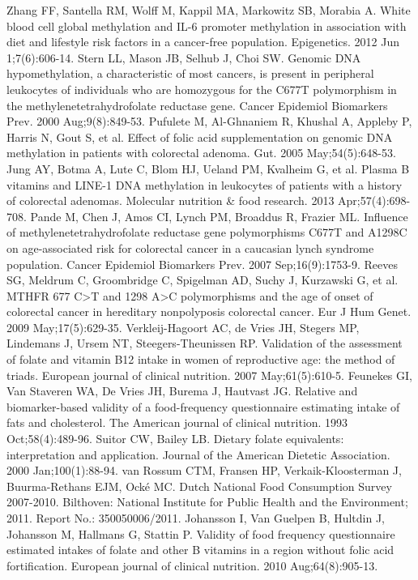 \begin{thebibliography}{12}
		Zhang FF, Santella RM, Wolff M, Kappil MA, Markowitz SB, Morabia A. White blood cell global methylation and IL-6 promoter methylation in association with diet and lifestyle risk factors in a cancer-free population. Epigenetics. 2012 Jun 1;7(6):606-14.
		Stern LL, Mason JB, Selhub J, Choi SW. Genomic DNA hypomethylation, a characteristic of most cancers, is present in peripheral leukocytes of individuals who are homozygous for the C677T polymorphism in the methylenetetrahydrofolate reductase gene. Cancer Epidemiol Biomarkers Prev. 2000 Aug;9(8):849-53.
		Pufulete M, Al-Ghnaniem R, Khushal A, Appleby P, Harris N, Gout S, et al. Effect of folic acid supplementation on genomic DNA methylation in patients with colorectal adenoma. Gut. 2005 May;54(5):648-53.
		Jung AY, Botma A, Lute C, Blom HJ, Ueland PM, Kvalheim G, et al. Plasma B vitamins and LINE-1 DNA methylation in leukocytes of patients with a history of colorectal adenomas. Molecular nutrition \& food research. 2013 Apr;57(4):698-708.
		Pande M, Chen J, Amos CI, Lynch PM, Broaddus R, Frazier ML. Influence of methylenetetrahydrofolate reductase gene polymorphisms C677T and A1298C on age-associated risk for colorectal cancer in a caucasian lynch syndrome population. Cancer Epidemiol Biomarkers Prev. 2007 Sep;16(9):1753-9.
		Reeves SG, Meldrum C, Groombridge C, Spigelman AD, Suchy J, Kurzawski G, et al. MTHFR 677 C>T and 1298 A>C polymorphisms and the age of onset of colorectal cancer in hereditary nonpolyposis colorectal cancer. Eur J Hum Genet. 2009 May;17(5):629-35.
		Verkleij-Hagoort AC, de Vries JH, Stegers MP, Lindemans J, Ursem NT, Steegers-Theunissen RP. Validation of the assessment of folate and vitamin B12 intake in women of reproductive age: the method of triads. European journal of clinical nutrition. 2007 May;61(5):610-5.
		Feunekes GI, Van Staveren WA, De Vries JH, Burema J, Hautvast JG. Relative and biomarker-based validity of a food-frequency questionnaire estimating intake of fats and cholesterol. The American journal of clinical nutrition. 1993 Oct;58(4):489-96.
		Suitor CW, Bailey LB. Dietary folate equivalents: interpretation and application. Journal of the American Dietetic Association. 2000 Jan;100(1):88-94.
		van Rossum CTM, Fransen HP, Verkaik-Kloosterman J, Buurma-Rethans EJM, Ock{\'e} MC. Dutch National Food Consumption Survey 2007-2010. Bilthoven: National Institute for Public Health and the Environment; 2011. Report No.: 350050006/2011.
		Johansson I, Van Guelpen B, Hultdin J, Johansson M, Hallmans G, Stattin P. Validity of food frequency questionnaire estimated intakes of folate and other B vitamins in a region without folic acid fortification. European journal of clinical nutrition. 2010 Aug;64(8):905-13.

\end{thebibliography}
